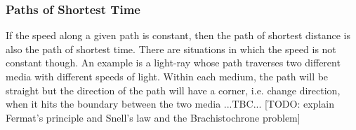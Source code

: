 
\subsubsection{Paths of Shortest Time}
If the speed along a given path is constant, then the path of shortest distance is also the path of shortest time. There are situations in which the speed is not constant though. An example is a light-ray whose path traverses two different media with different speeds of light. Within each medium, the path will be straight but the direction of the path will have a corner, i.e. change direction, when it hits the boundary between the two media ...TBC... [TODO: explain Fermat's principle and Snell's law and the Brachistochrone problem]



%
%




